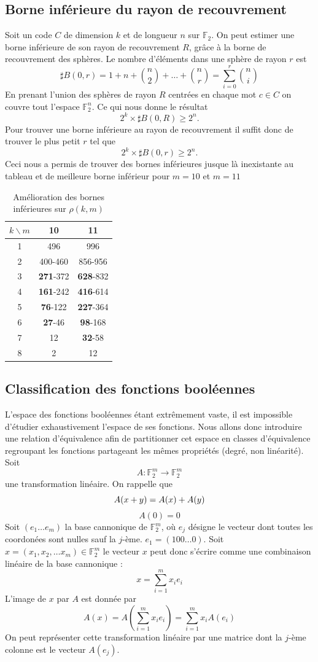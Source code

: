 \documentclass{article}
\def\FF{\ensuremath{\mathbb{F}}}
\begin{document}
\subsection{Borne inférieure du rayon de recouvrement}
Soit un code $C$ de dimension $k$ et de longueur $n$ sur $\FF_2$. On peut estimer une borne inférieure de son rayon de recouvrement $R$, grâce à la borne de recouvrement des sphères.
Le nombre d'éléments dans une sphère de rayon $r$ est
$$
\sharp B(0, r) = 1 + n + \binom{n}{2} + \dots + \binom{n}{r} = \sum_{i=0}^r \binom{n}{i}
$$
En prenant l'union des sphères de rayon $R$ centrées en chaque mot $c \in C$ on couvre tout l'espace $\FF_2^n$. Ce qui nous donne le résultat
$$
2^k \times \sharp B(0,R) \geq 2^n.
$$
Pour trouver une borne inférieure au rayon de recouvrement il suffit donc de trouver le plus petit $r$ tel que
$$
2^k \times \sharp B(0, r) \geq 2^n.
$$
Ceci nous a permis de trouver des bornes inférieures jusque là inexistante au tableau et de meilleure borne inférieur pour $m = 10$ et $m=11$
\begin{table}
	\center
	\caption{Amélioration des bornes inférieures sur $\rho(k,m)$}
	\label{tab:tab_inf}
	\begin{tabular}{c|cc}
		$k\backslash m$ & 10 & 11 \\
		\hline
		1 &496 & 996 \\
		2 & 400-460 & 856-956 \\
		3 & \textbf{271}-372 & \textbf{628}-832 \\
		4 & \textbf{161}-242 & \textbf{416}-614 \\
		5 & \textbf{76}-122 & \textbf{227}-364 \\
		6 & \textbf{27}-46 & \textbf{98}-168 \\
		7 & 12 & \textbf{32}-58 \\
		8 & 2 & 12 \\
		\hline
	\end{tabular}
\end{table}

\subsection{Classification des fonctions booléennes}
L’espace des fonctions booléennes étant extrêmement vaste, il est impossible d’étudier exhaustivement l'espace de ses fonctions.
Nous allons donc introduire une relation d’équivalence afin de partitionner cet espace en classes d’équivalence regroupant les fonctions partageant les mêmes propriétés (degré, non linéarité).
Soit
\[
A : \mathbb{F}_2^m \to \mathbb{F}_2^m
\]
une transformation linéaire. On rappelle que
$$
A(x + y) = A(x) + A(y) \\
$$
$$
A(0) = 0
$$
Soit $(e_1 \dots e_m)$ la base cannonique de $\FF_2^m$, où $e_j$ désigne le vecteur dont toutes les coordonées sont nulles sauf la $j$-ème. $e_1 = (100\dots0)$.
Soit $x=(x_1, x_2, \dots x_m) \in \FF_2^m$ le vecteur $x$ peut donc s'écrire comme une combinaison linéaire de la base cannonique : 
$$
x = \sum_{i=1}^{m} x_ie_i
$$
L'image de $x$ par $A$ est donnée par
$$
A(x) = A(\sum_{i=1}^{m} x_ie_i) = \sum_{i=1}^m x_i A(e_i)
$$
On peut représenter cette transformation linéaire par une matrice dont la $j$-ème colonne est le vecteur $A(e_j)$.
\end{document}
